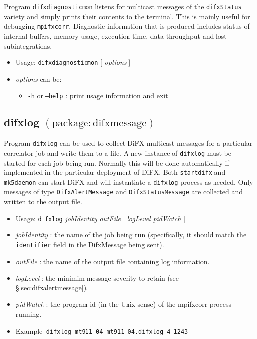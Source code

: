 Program {\tt difxdiagnosticmon} listens for multicast messages of the {\tt difxStatus} variety and simply prints their contents to the terminal.
This is mainly useful for debugging {\tt mpifxcorr}.
Diagnostic information that is produced includes status of internal buffers, memory usage, execution time, data throughput and lost subintegrations.

\begin{itemize}
\item[] Usage: {\tt difxdiagnosticmon} $[$ {\em options} $]$ 
\item[] {\em options} can be:
\begin{itemize}
\item[] {\tt -h} or {\tt --help} : print usage information and exit
\end{itemize}
\end{itemize}






\subsection{difxlog {\small $\mathrm{(package: difxmessage)}$}} \label{sec:difxlogprogram} 

Program {\tt difxlog} can be used to collect DiFX multicast messages for a particular correlator job and write them to a file.
A new instance of {\tt difxlog} must be started for each job being run.
Normally this will be done automatically if implemented in the particular deployment of DiFX.
Both {\tt startdifx} and {\tt mk5daemon} can start DiFX and will instantiate a {\tt difxlog} process as needed.
Only messages of type {\tt DifxAlertMessage} and {\tt DifxStatusMessage} are collected and written to the output file.

\begin{itemize}
\item[] Usage: {\tt difxlog} {\em jobIdentity} {\em outFile} $[$ {\em logLevel} {\em pidWatch} $]$ 
\item[] {\em jobIdentity} : the name of the job being run (specifically, it should match the {\tt identifier} field in the DifxMessage being sent).
\item[] {\em outFile} : the name of the output file containing log information.
\item[] {\em logLevel} : the minimim message severity to retain (see \S\ref{sec:difxalertmessage}).
\item[] {\em pidWatch} : the program id (in the Unix sense) of the mpifxcorr process running.
\item[] Example: {\tt difxlog mt911\_04 mt911\_04.difxlog 4 1243}
\end{itemize}

